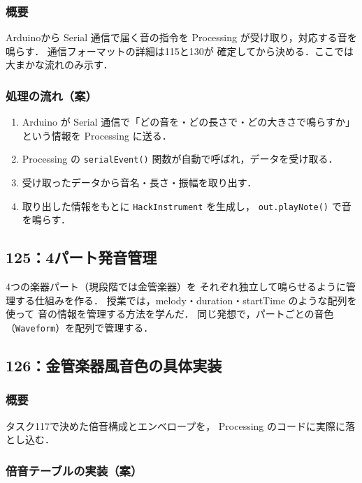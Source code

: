 \documentclass[a4paper,12pt]{jsarticle}
\begin{document}
\subsubsection{概要}
Arduinoから Serial 通信で届く音の指令を
Processing が受け取り，対応する音を鳴らす．
通信フォーマットの詳細は115と130が
確定してから決める．ここでは大まかな流れのみ示す．

\subsubsection{処理の流れ（案）}

\begin{enumerate}
  \item Arduino が Serial 通信で「どの音を・どの長さで・どの大きさで鳴らすか」
        という情報を Processing に送る．
  \item Processing の \texttt{serialEvent()} 関数が自動で呼ばれ，データを受け取る．
  \item 受け取ったデータから音名・長さ・振幅を取り出す．
  \item 取り出した情報をもとに \texttt{HackInstrument} を生成し，
        \texttt{out.playNote()} で音を鳴らす．
\end{enumerate}

\subsection{125：4パート発音管理}
\label{sec:detail-125}

4つの楽器パート（現段階では金管楽器）を
それぞれ独立して鳴らせるように管理する仕組みを作る．
授業では，melody・duration・startTime のような配列を使って
音の情報を管理する方法を学んだ．
同じ発想で，パートごとの音色（\texttt{Waveform}）を配列で管理する．

\subsection{126：金管楽器風音色の具体実装}
\label{sec:detail-126}

\subsubsection{概要}
タスク117で決めた倍音構成とエンベロープを，
Processing のコードに実際に落とし込む．

\subsubsection{倍音テーブルの実装（案）}
\end{document}
